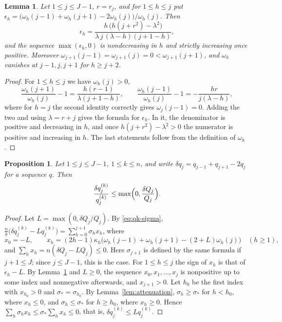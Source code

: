 \documentclass[11pt]{amsart}
\newtheorem{proposition}[theorem]{Proposition}
\newtheorem{lemma}[theorem]{Lemma}
\theoremstyle{definition}
\theoremstyle{remark}
\numberwithin{equation}{section}
\begin{document}
\begin{lemma}\label{lem:one-crossing}
Let $1\le j\le J-1$, $r=r_j$, and for $1\le h\le j$ put $\epsilon_h=\bigl(\omega_h(j-1)+\omega_h(j+1)-2\omega_h(j)\bigr)/\omega_h(j)$. Then
\[
\epsilon_h=\frac{h\,\bigl(h(j+r^2)-\lambda^2\bigr)}{\lambda\,j\,(\lambda-h)(j+1-h)},
\]
and the sequence $\max(\epsilon_h,0)$ is nondecreasing in $h$ and strictly increasing once positive. Moreover $\omega_{j+1}(j-1)=\omega_{j+1}(j)=0<\omega_{j+1}(j+1)$, and $\omega_h$ vanishes at $j-1,j,j+1$ for $h\ge j+2$.
\end{lemma}

\begin{proof}
For $1\le h\le j$ we have $\omega_h(j)>0$,
\[
\frac{\omega_h(j+1)}{\omega_h(j)}-1=\frac{h(r-1)}{\lambda(j+1-h)},\qquad\frac{\omega_h(j-1)}{\omega_h(j)}-1=-\frac{hr}{j(\lambda-h)},
\]
where for $h=j$ the second identity correctly gives $\omega_j(j-1)=0$. Adding the two and using $\lambda=r+j$ gives the formula for $\epsilon_h$. In it, the denominator is positive and decreasing in $h$, and once $h(j+r^2)-\lambda^2>0$ the numerator is positive and increasing in $h$. The last statements follow from the definition of $\omega_h$.
\end{proof}

\begin{proposition}\label{prop:compare}
Let $1\le j\le J-1$, $1\le k\le n$, and write $\delta q_j=q_{j-1}+q_{j+1}-2q_j$ for a sequence $q$. Then
\[
\frac{\delta q^{(k)}_j}{q^{(k)}_j}\le\max\Bigl(0,\frac{\delta Q_j}{Q_j}\Bigr).
\]
\end{proposition}

\begin{proof}
Let $L=\max(0,\delta Q_j/Q_j)$. By \eqref{eq:qk-sigma}, $\frac nk\bigl(\delta q^{(k)}_j-Lq^{(k)}_j\bigr)=\sum_{h=0}^{j+1}\sigma_hx_h$, where
\[
x_0=-L,\qquad x_h=(2h-1)\kappa_h\bigl(\omega_h(j-1)+\omega_h(j+1)-(2+L)\omega_h(j)\bigr)\quad(h\ge1),
\]
and $\sum_hx_h=n(\delta Q_j-LQ_j)\le0$. Here $\sigma_{j+1}$ is defined by the same formula if $j+1\le J$; since $j\le J-1$, this is the case. For $1\le h\le j$ the sign of $x_h$ is that of $\epsilon_h-L$. By Lemma~\ref{lem:one-crossing} and $L\ge0$, the sequence $x_0,x_1,\dots,x_j$ is nonpositive up to some index and nonnegative afterwards, and $x_{j+1}>0$. Let $h_0$ be the first index with $x_{h_0}>0$ and $\sigma_*=\sigma_{h_0}$. By Lemma~\ref{lem:attenuation}, $\sigma_h\ge\sigma_*$ for $h<h_0$, where $x_h\le0$, and $\sigma_h\le\sigma_*$ for $h\ge h_0$, where $x_h\ge0$. Hence $\sum_h\sigma_hx_h\le\sigma_*\sum_hx_h\le0$, that is, $\delta q^{(k)}_j\le Lq^{(k)}_j$.
\end{proof}
\end{document}

